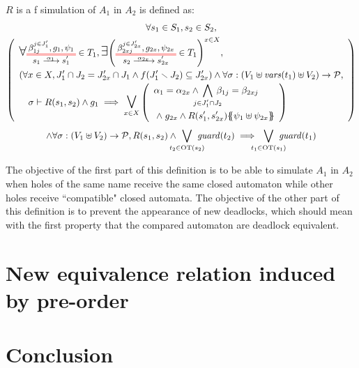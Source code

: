 \documentclass{article}
\begin{document}
\begin{defi}[f simulation]
\(R\) is a f simulation of \(A_1\) in \(A_2\) is defined as:
\begin{multline*}
	\forall s_1 \in S_1, s_2 \in S_2, \\
	\mpar{\renewcommand\arraystretch{1.4}\everymath{\displaystyle}\begin{array}{l}
		\bigsymb{\forall} \OTx{1}{}{1}{1} \in T_1, \bigsymb{\exists} \mpar{\OTx{2}{x}{2x}{2x} \in T_1}^{x \in X}, \\
		\mpar{\forall x \in X, J'_1 \cap J_2 = J'_{2x} \cap J_1 \wedge f\mpar{J'_1 \setminus J_2} \subseteq J'_{2x}} \wedge \forall \sigma: \mpar{V_1 \uplus \fvars{t_1} \uplus V_2} \to \values, \\
		\quad \sigma \vdash R\mpar{s_1, s_2} \wedge g_1 \implies \operatorname*{\bigsymb{\bigvee}}_{x \in X} \mpar{\begin{array}{l}
			\alpha_1 = \alpha_{2x} \wedge \bigwedge_\subbox{j \in J'_1 \cap J_2} \beta_{1j} = \beta_{2xj} \\
			\nwedge g_{2x} \wedge R\mpar{s'_1, s'_{2x}}\psubst{\psi_1 \uplus \psi_{2x}}
		\end{array}} \\
	\end{array}} \\
	\wedge \forall \sigma: \mpar{V_1 \uplus V_2} \to \values, R\mpar{s_1, s_2} \wedge \bigvee_\subbox{t_2 \in \fOT{s_2}} \fguard{t_2} \implies \bigvee_\subbox{t_1 \in \fOT{s_1}} \fguard{t_1}
\end{multline*}
\end{defi}
The objective of the first part of this definition is to be able to simulate \(A_1\) in \(A_2\) when holes of the same name receive the same closed automaton while other holes receive ``compatible" closed automata.
The objective of the other part of this definition is to prevent the appearance of new deadlocks, which should mean with the first property that the compared automaton are deadlock equivalent.


\section{New equivalence relation induced by pre-order}


\section{Conclusion}
\end{document}

